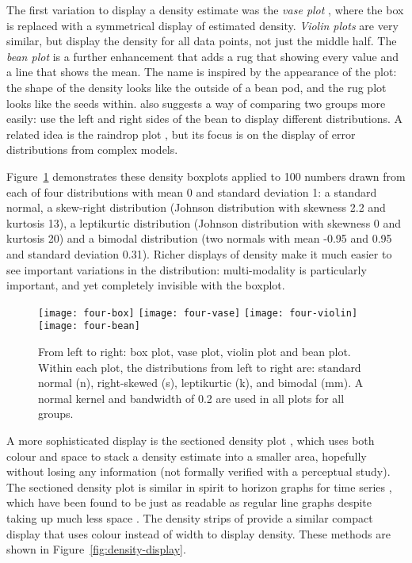 \documentclass[oneside]{article}
\begin{document}
The first variation to display a density estimate was the \emph{vase plot} \citep{benjamini:1988}, where the box is replaced with a symmetrical display of estimated density. \emph{Violin plots} \citep{hintze:1998} are very similar, but display the density for all data points, not just the middle half. The \emph{bean plot} \citep{kampstra:2008} is a further enhancement that adds a rug that showing every value and a line that shows the mean. The name is inspired by the appearance of the plot: the shape of the density looks like the outside of a bean pod, and the rug plot looks like the seeds within. \citet{kampstra:2008} also suggests a way of comparing two groups more easily: use the left and right sides of the bean to display different distributions. A related idea is the raindrop plot \citep{barrowman:2003}, but its focus is on the display of error distributions from complex models.

Figure~\ref{fig:density} demonstrates these density boxplots applied to 100 numbers drawn from each of four distributions with mean 0 and standard deviation 1: a standard normal, a skew-right distribution (Johnson distribution with skewness 2.2 and kurtosis 13), a leptikurtic distribution (Johnson distribution with skewness 0 and kurtosis 20) and a bimodal distribution (two normals with mean -0.95 and 0.95 and standard deviation 0.31). Richer displays of density make it much easier to see important variations in the distribution: multi-modality is particularly important, and yet completely invisible with the boxplot.

\begin{figure}[htbp]
  \centering
  \texttt{[image: four-box]}%
  \texttt{[image: four-vase]}%
  \texttt{[image: four-violin]}%
  \texttt{[image: four-bean]}
  \caption{From left to right: box plot, vase plot, violin plot and bean plot.  
Within each plot, the distributions from left to right are: standard normal (n), right-skewed (s), leptikurtic (k), and bimodal (mm). A normal kernel and bandwidth of 0.2 are used in all plots for all groups.}
  \label{fig:density}
\end{figure}

A more sophisticated display is the sectioned density plot \citep{cohen:2006}, which uses both colour and space to stack a density estimate into a smaller area, hopefully without losing any information (not formally verified with a perceptual study). The sectioned density plot is similar in spirit to horizon graphs for time series \citep{reijner:2008}, which have been found to be just as readable as regular line graphs despite taking up much less space \citep{heer:2009}. The density strips of \citet{jackson:2008} provide a similar compact display that uses colour instead of width to display density. These methods are shown in Figure~\ref{fig:density-display}. 
\end{document}
